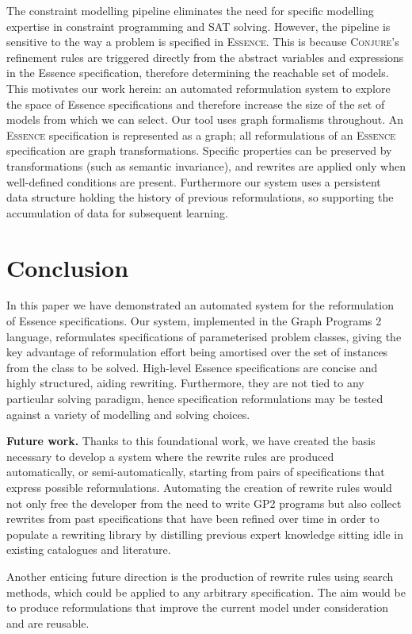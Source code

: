 \documentclass[anonymous,a4paper,UKenglish,cleveref,pdfa]{lipics-v2021}
\newcommand{\essence}{\textsc{Essence}\xspace}
\newcommand{\conjure}{\textsc{Conjure}\xspace}
\begin{document}
{The constraint modelling pipeline eliminates the need for specific modelling expertise in constraint programming and SAT solving.
However, the pipeline is sensitive to the way a problem is specified in \essence. This is because \conjure's refinement rules are triggered directly from the abstract variables and expressions in the {\sc Essence} specification, therefore determining the reachable set of models.
This motivates our work herein: an automated reformulation system to explore the space of {\sc Essence} specifications and therefore increase the size of the set of models from which we can select. Our tool uses graph formalisms throughout. An \essence specification is represented as a graph; all reformulations of an \essence specification are graph transformations. Specific properties can be preserved by transformations (such as semantic invariance), and rewrites are applied only when well-defined conditions are present. Furthermore our system uses a persistent data structure holding the history of previous reformulations, so supporting the accumulation of data for subsequent learning.
}

\section{Conclusion}

In this paper we have demonstrated an automated system for the reformulation of {\sc Essence} specifications. Our system, implemented in the Graph Programs 2 language, reformulates specifications of parameterised problem classes, giving the key advantage of reformulation effort being amortised over the set of instances from the class to be solved. 
High-level {\sc Essence} specifications are concise and highly structured, aiding rewriting. Furthermore, they are not tied to any particular solving paradigm, hence specification reformulations may be tested against a variety of modelling and solving choices.

{\bf Future work.}
Thanks to this foundational work, we have created the basis necessary to develop a system where the rewrite rules are produced automatically, or semi-automatically, starting from pairs of specifications that express possible reformulations. Automating the creation of rewrite rules would not only free the developer from the need to write GP2 programs but also collect rewrites from past specifications that have been refined over time in order to populate a rewriting library by distilling previous expert knowledge sitting idle in existing catalogues and literature.

Another enticing future direction is the production of rewrite rules using search methods, which could be applied to any arbitrary specification. The aim would be to produce reformulations that improve the current model under consideration and are reusable.


\end{document}
